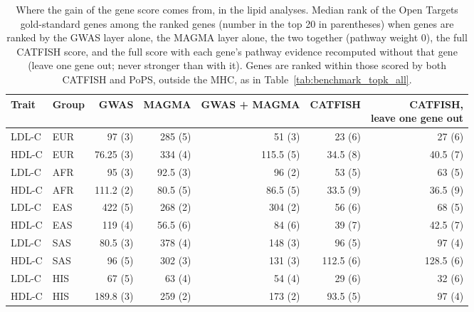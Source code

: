 \begin{table}[!htbp]
\centering
\caption{Where the gain of the gene score comes from, in the lipid analyses. Median rank of the Open Targets gold-standard genes among the ranked genes (number in the top 20 in parentheses) when genes are ranked by the GWAS layer alone, the MAGMA layer alone, the two together (pathway weight $0$), the full CATFISH score, and the full score with each gene's pathway evidence recomputed without that gene (leave one gene out; never stronger than with it). Genes are ranked within those scored by both CATFISH and PoPS, outside the MHC, as in Table~\ref{tab:benchmark_topk_all}.}
\label{tab:logo_recovery}
\small
\begin{tabular*}{\linewidth}{@{\extracolsep{\fill}}llrrrrr}
\hline
\textbf{Trait} & \textbf{Group} & GWAS & MAGMA & GWAS + MAGMA & CATFISH & \makecell[r]{CATFISH,\\leave one gene out} \\
\hline
LDL-C & EUR & 97 (3) & 285 (5) & 51 (3) & 23 (6) & 27 (6) \\
HDL-C & EUR & 76.25 (3) & 334 (4) & 115.5 (5) & 34.5 (8) & 40.5 (7) \\
LDL-C & AFR & 95 (3) & 92.5 (3) & 96 (2) & 53 (5) & 63 (5) \\
HDL-C & AFR & 111.2 (2) & 80.5 (5) & 86.5 (5) & 33.5 (9) & 36.5 (9) \\
LDL-C & EAS & 422 (5) & 268 (2) & 304 (2) & 56 (6) & 68 (5) \\
HDL-C & EAS & 119 (4) & 56.5 (6) & 84 (6) & 39 (7) & 42.5 (7) \\
LDL-C & SAS & 80.5 (3) & 378 (4) & 148 (3) & 96 (5) & 97 (4) \\
HDL-C & SAS & 96 (5) & 302 (3) & 131 (3) & 112.5 (6) & 128.5 (6) \\
LDL-C & HIS & 67 (5) & 63 (4) & 54 (4) & 29 (6) & 32 (6) \\
HDL-C & HIS & 189.8 (3) & 259 (2) & 173 (2) & 93.5 (5) & 97 (4) \\
\hline
\end{tabular*}
\end{table}
